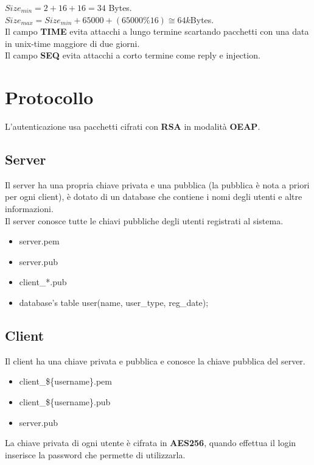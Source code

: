 \documentclass[a4paper,titlepage]{article}
\begin{document}
$Size_{min} = 2 + 16 + 16 = 34$ Bytes.\\
$Size_{max} = Size_{min} + 65000 + ( 65000 \% 16 ) \cong 64k$Bytes.\\

Il campo \textbf{TIME} evita attacchi a lungo termine scartando pacchetti con una data in unix-time maggiore di due giorni.\\
Il campo \textbf{SEQ} evita attacchi a corto termine come reply e injection.
\section{Protocollo}
L'autenticazione usa pacchetti cifrati con \textbf{RSA} in modalità \textbf{OEAP}.
\subsection{Server}
Il server ha una propria chiave privata e una pubblica (la pubblica è nota a priori per ogni client), è dotato di un database che contiene i nomi degli utenti e altre informazioni.\\
Il server conosce tutte le chiavi pubbliche degli utenti registrati al sistema.
\begin{itemize}
\item server.pem
\item server.pub
\item client\_*.pub
\item database's table user(name, user\_type, reg\_date);
\end{itemize}

\subsection{Client}
Il client ha una chiave privata e pubblica e conosce la chiave pubblica del server.
\begin{itemize}
\item client\_\$\{username\}.pem
\item client\_\$\{username\}.pub
\item server.pub
\end{itemize}
La chiave privata di ogni utente è cifrata in \textbf{AES256}, quando effettua il login inserisce la password che permette di utilizzarla.

\iffalse
\end{document}
